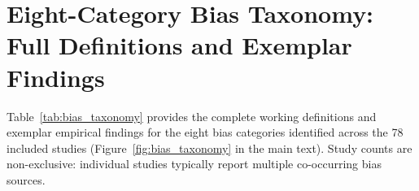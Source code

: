 
\section{Eight-Category Bias Taxonomy: Full Definitions and Exemplar Findings}
\label{app:S2}

Table~\ref{tab:bias_taxonomy} provides the complete working definitions
and exemplar empirical findings for the eight bias categories identified
across the 78 included studies (Figure~\ref{fig:bias_taxonomy} in the
main text). Study counts are non-exclusive: individual studies
typically report multiple co-occurring bias sources.

